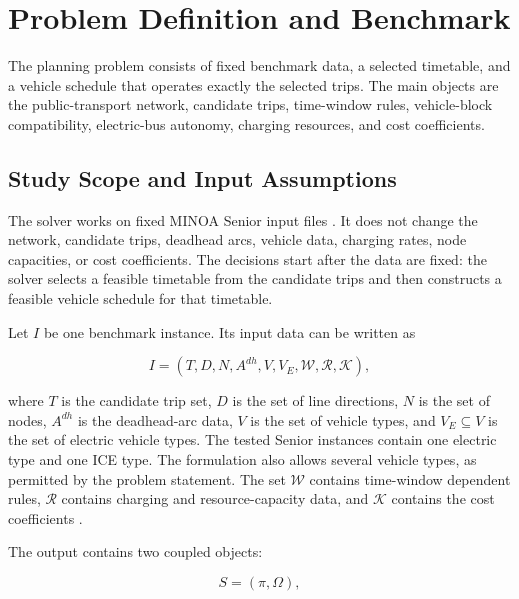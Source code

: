 \chapter{Problem Definition and Benchmark}
\label{chap:problem}

The planning problem consists of fixed benchmark data, a selected timetable, and
a vehicle schedule that operates exactly the selected trips. The main objects
are the public-transport network, candidate trips, time-window rules,
vehicle-block compatibility, electric-bus autonomy, charging resources, and cost
coefficients.

\section{Study Scope and Input Assumptions}

The solver works on fixed MINOA Senior input files \cite{minoa-io,minoa-problem,minoa-rules}. It does not change the
network, candidate trips, deadhead arcs, vehicle data, charging rates, node
capacities, or cost coefficients. The decisions start after the data are fixed:
the solver selects a feasible timetable from the candidate trips and then
constructs a feasible vehicle schedule for that timetable.

Let \(I\) be one benchmark instance. Its input data can be written as

\begin{equation}
I=
\left(
T,D,N,A^{dh},V,V_E,\mathcal{W},\mathcal{R},\mathcal{K}
\right),
\label{eq:instance-tuple}
\end{equation}

where \(T\) is the candidate trip set, \(D\) is the set of line directions,
\(N\) is the set of nodes, \(A^{dh}\) is the deadhead-arc data, \(V\) is the
set of vehicle types, and \(V_E\subseteq V\) is the set of electric vehicle
types. The tested Senior instances contain one electric type and one ICE type.
The formulation also allows several vehicle types, as permitted by the problem
statement. The set \(\mathcal{W}\) contains time-window dependent rules,
\(\mathcal{R}\) contains charging and resource-capacity data, and
\(\mathcal{K}\) contains the cost coefficients \cite{minoa-problem,minoa-io}.

The output contains two coupled objects:

\begin{equation}
S=(\pi,\Omega),
\label{eq:solution-pair}
\end{equation}

